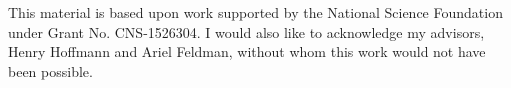 \acknowledgments
This material is based upon work supported by the National Science Foundation under Grant No. CNS-1526304. I would also like to acknowledge my advisors, Henry Hoffmann and Ariel Feldman, without whom this work would not have been possible.
